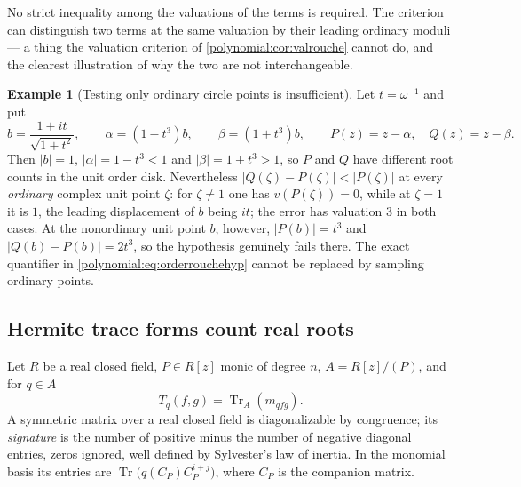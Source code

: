 \documentclass[11pt,letterpaper]{article}
\numberwithin{equation}{section}
\theoremstyle{definition}
\newtheorem{example}[theorem]{Example}
\theoremstyle{remark}\newtheorem{remark}[theorem]{Remark}
\newcommand{\Tr}{\operatorname{Tr}}
\begin{document}
No strict inequality among the valuations of the terms is required. The
criterion can distinguish two terms at the same valuation by their leading
ordinary moduli --- a thing the valuation criterion of
\cref{polynomial:cor:valrouche} cannot do, and the clearest illustration of
why the two are not interchangeable.

\begin{example}[Testing only ordinary circle points is insufficient]
\label{polynomial:ex:circlewarning}
Let $t=\omega^{-1}$ and put
\[
 b=\frac{1+it}{\sqrt{1+t^2}},\qquad \alpha=(1-t^3)b,\qquad \beta=(1+t^3)b,
 \qquad P(z)=z-\alpha,\quad Q(z)=z-\beta .
\]
Then $|b|=1$, $|\alpha|=1-t^3<1$ and $|\beta|=1+t^3>1$, so $P$ and $Q$ have
different root counts in the unit order disk. Nevertheless
$|Q(\zeta)-P(\zeta)|<|P(\zeta)|$ at every \emph{ordinary} complex unit point
$\zeta$: for $\zeta\ne1$ one has $v(P(\zeta))=0$, while at $\zeta=1$ it is
$1$, the leading displacement of $b$ being $it$; the error has valuation $3$
in both cases. At the nonordinary unit point $b$, however, $|P(b)|=t^3$ and
$|Q(b)-P(b)|=2t^3$, so the hypothesis genuinely fails there. The exact
quantifier in \eqref{polynomial:eq:orderrouchehyp} cannot be replaced by
sampling ordinary points.
\end{example}

\subsection{Hermite trace forms count real roots}
Let $R$ be a real closed field, $P\in R[z]$ monic of degree $n$,
$A=R[z]/(P)$, and for $q\in A$
\begin{equation}\label{polynomial:eq:hermiteform}
 T_q(f,g)=\Tr_A(m_{qfg}).
\end{equation}
A symmetric matrix over a real closed field is diagonalizable by congruence;
its \emph{signature} is the number of positive minus the number of negative
diagonal entries, zeros ignored, well defined by Sylvester's law of inertia.
In the monomial basis its entries are $\Tr\bigl(q(C_P)C_P^{i+j}\bigr)$, where
$C_P$ is the companion matrix.
\end{document}
